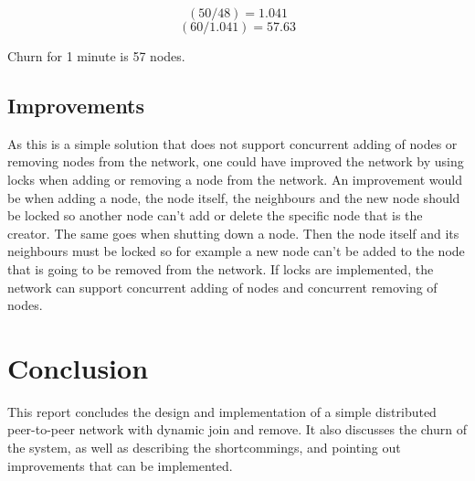 \begin{equation}
(50/48) = 1.041
\end{equation}
\begin{equation}
(60/1.041) = 57.63
\end{equation}

Churn for 1 minute is 57 nodes.

\subsection{Improvements}
As this is a simple solution that does not support concurrent adding of nodes or removing nodes from the network, one could have improved the network by using locks when adding or removing a node from the network.
An improvement would be when adding a node, the node itself, the neighbours and the new node should be locked so another node can’t add or delete the specific node that is the creator.
The same goes when shutting down a node. Then the node itself and its neighbours must be locked so for example a new node can’t be added to the node that is going to be removed from the network. If locks are implemented, the network can support concurrent adding of nodes and concurrent removing of nodes.

\section{Conclusion}
This report concludes the design and implementation of a simple distributed peer-to-peer network with dynamic join and remove. It also discusses the churn of the system, as well as describing the shortcommings, and pointing out improvements that can be implemented.



\newpage{}

\printbibliography



